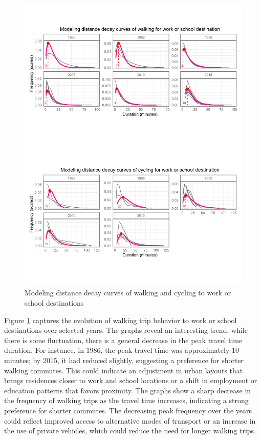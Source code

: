 \documentclass[
11pt, %
oneside, %
english, %
singlespacing, %
]{macthesis} %
\begin{document}
\begin{figure}

{\centering \includegraphics[width=1\linewidth]{figure/ch03_fig_04} 

}

\caption{Modeling distance decay curves of walking and cycling to work or school destinations}\label{fig:ch03-plot-fig-04}
\end{figure}

Figure \ref{fig:ch03-plot-fig-04} captures the evolution of walking trip behavior to work or school destinations over selected years. The graphs reveal an interesting trend: while there is some fluctuation, there is a general decrease in the peak travel time duration. For instance, in 1986, the peak travel time was approximately 10 minutes; by 2015, it had reduced slightly, suggesting a preference for shorter walking commutes. This could indicate an adjustment in urban layouts that brings residences closer to work and school locations or a shift in employment or education patterns that favors proximity. The graphs show a sharp decrease in the frequency of walking trips as the travel time increases, indicating a strong preference for shorter commutes. The decreasing peak frequency over the years could reflect improved access to alternative modes of transport or an increase in the use of private vehicles, which could reduce the need for longer walking trips.
\end{document}
